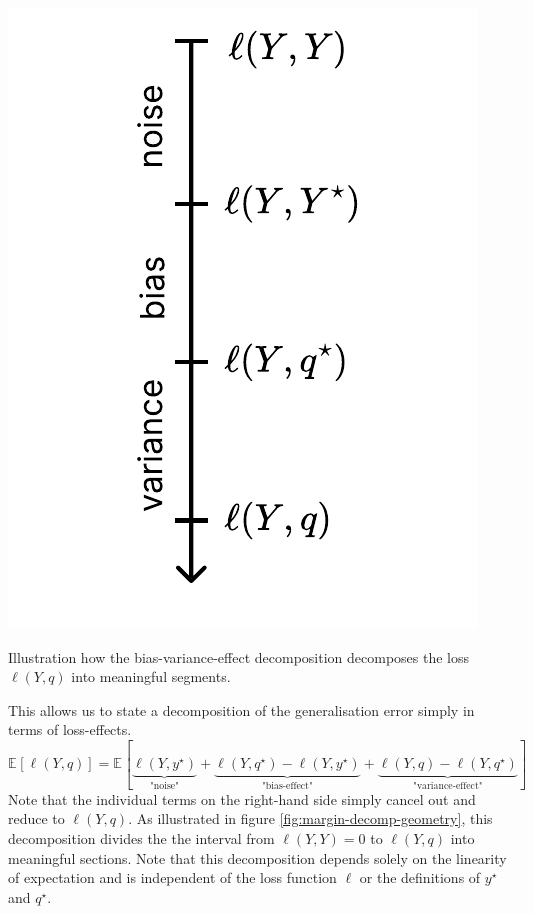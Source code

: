 \documentclass[
    a4paper, %
	fontsize=10pt, %
	twoside=false, %
]{kaobook}
\begin{document}
\begin{titlepage}
\begin{marginfigure}
  \label{fig:margin-decomp-geometry}
  \includegraphics[width=\textwidth]{figma-illustrations/effect-decomp.pdf}
  \caption{
    Illustration how the bias-variance-effect decomposition decomposes the loss $\ell(Y, q)$ into meaningful segments.
  }
\end{marginfigure}

This allows us to state a decomposition of the generalisation error simply in terms of loss-effects.
$$
\mathbb{E}_{}\left[ \ell(Y,q) \right]  = \mathbb{E}_{}\left[  \underbrace{ \ell(Y, y^\star) }_{\text{"noise"} }
+
\underbrace{ \ell(Y, q^\star) - \ell(Y, y^\star) }_{\text{"bias-effect"} }
+ 
\underbrace{ \ell(Y, q) - \ell(Y, q^\star) }_{\text{"variance-effect"} } \right]
$$
Note that the individual terms on the right-hand side simply cancel out and reduce to $\ell(Y, q)$. As illustrated in figure \ref{fig:margin-decomp-geometry}, this decomposition divides the the interval from $\ell(Y, Y) = 0$ to $\ell(Y, q)$ into meaningful sections. 
Note that this decomposition depends solely on the linearity of expectation and is independent of the loss function $\ell$ or the definitions of $y^\star$ and $q^\star$.


\end{titlepage}
\end{document}
